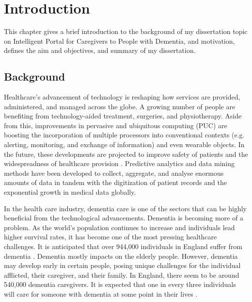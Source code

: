 \def\baselinestretch{1}

\chapter{Introduction}

\def\baselinestretch{1.44}


This chapter gives a brief introduction to the background of my dissertation topic on Intelligent Portal for Caregivers to People with Dementia, and motivation, defines the aim and objectives, and summary of my dissertation.
   

\smallskip

\goodbreak
\section{Background}

Healthcare's advancement of technology is reshaping how services are provided, administered, and managed across the globe. A growing number of people are benefiting from technology-aided treatment, surgeries, and physiotherapy. Aside from this, improvements in pervasive and ubiquitous computing (PUC) are boosting the incorporation of multiple processors into conventional contexts (e.g. alerting, monitoring, and exchange of information) and even wearable objects. In the future, these developments are projected to improve safety of patients and the widespreadness of healthcare provision \citep{int1}. Predictive analytics and data mining methods have been developed to collect, aggregate, and analyse enormous amounts of data in tandem with the digitization of patient records and the exponential growth in medical data globally.

In the health care industry, dementia care is one of the sectors that can be highly beneficial from the technological advancements. Dementia is becoming more of a problem. As the world's population continues to increase and individuals lead higher survival rates, it has become one of the most pressing healthcare challenges. It is anticipated that over 944,000 individuals in England suffer from dementia \citep{one}. Dementia mostly impacts on the elderly people. However, dementia may develop early in certain people, posing unique challenges for the individual afflicted, their caregiver, and their family. In England, there seem to be around 540,000 dementia caregivers. It is expected that one in every three individuals will care for someone with dementia at some point in their lives \citep{two}.

